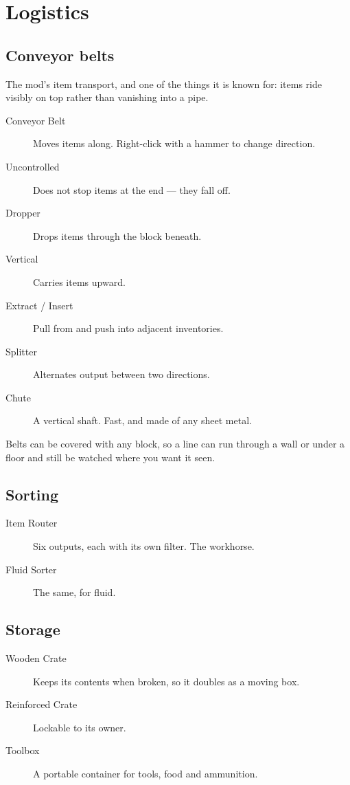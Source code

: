 \chapter{Logistics}
\label{ch:logistics}

\section{Conveyor belts}

The mod's item transport, and one of the things it is known for: items ride visibly on top rather
than vanishing into a pipe.

\begin{description}
\item[Conveyor Belt] Moves items along. Right-click with a hammer to change direction.
\item[Uncontrolled] Does not stop items at the end --- they fall off.
\item[Dropper] Drops items through the block beneath.
\item[Vertical] Carries items upward.
\item[Extract / Insert] Pull from and push into adjacent inventories.
\item[Splitter] Alternates output between two directions.
\item[Chute] A vertical shaft. Fast, and made of any sheet metal.
\end{description}

\begin{ietip}
Belts can be covered with any block, so a line can run through a wall or under a floor and still be
watched where you want it seen.
\end{ietip}

\section{Sorting}

\begin{description}
\item[Item Router] Six outputs, each with its own filter. The workhorse.
\item[Fluid Sorter] The same, for fluid.
\end{description}

\section{Storage}

\begin{description}
\item[Wooden Crate] Keeps its contents when broken, so it doubles as a moving box.
\item[Reinforced Crate] Lockable to its owner.
\item[Toolbox] A portable container for tools, food and ammunition.
\end{description}

